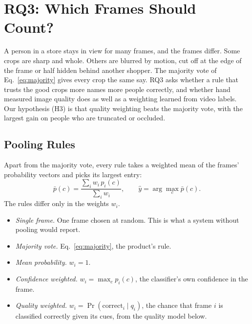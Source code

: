 
\providecommand{\rqthree}[2]{%
  \ifcsname rq3/#1/#2\endcsname\csname rq3/#1/#2\endcsname\else\textbf{??}\fi}

\section{RQ3: Which Frames Should Count?}
\label{sec:rq3}
A person in a store stays in view for many frames, and the frames differ. Some
crops are sharp and whole. Others are blurred by motion, cut off at the edge of
the frame or half hidden behind another shopper. The majority vote of
Eq.~\eqref{eq:majority} gives every crop the same say. RQ3 asks whether a rule
that trusts the good crops more names more people correctly, and whether hand
measured image quality does as well as a weighting learned from video labels.
Our hypothesis (H3) is that quality weighting beats the majority vote, with the
largest gain on people who are truncated or occluded.

\subsection{Pooling Rules}
Apart from the majority vote, every rule takes a weighted mean of the frames'
probability vectors and picks its largest entry:
\begin{equation}
\bar{p}(c) = \frac{\sum_i w_i\, p_i(c)}{\sum_i w_i}, \qquad
\hat{y} = \arg\max_{c} \bar{p}(c).
\label{eq:weighted}
\end{equation}
The rules differ only in the weights $w_i$.
\begin{itemize}
  \item \emph{Single frame.} One frame chosen at random. This is what a system
        without pooling would report.
  \item \emph{Majority vote.} Eq.~\eqref{eq:majority}, the product's rule.
  \item \emph{Mean probability.} $w_i = 1$.
  \item \emph{Confidence weighted.} $w_i = \max_c p_i(c)$, the classifier's own
        confidence in the frame.
  \item \emph{Quality weighted.} $w_i = \Pr(\mathrm{correct}_i \mid q_i)$, the
        chance that frame $i$ is classified correctly given its cues, from the
        quality model below.
\end{itemize}

